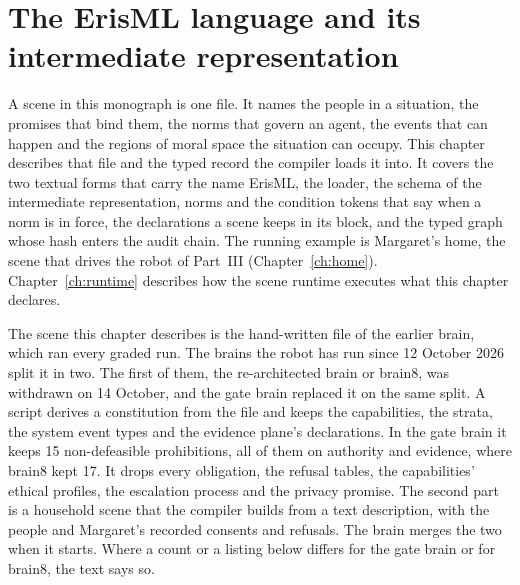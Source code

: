 \chapter{The ErisML language and its intermediate representation}\label{ch:erisml}

A scene in this monograph is one file. It names the people in a situation, the promises that bind
them, the norms that govern an agent, the events that can happen and the regions of moral space the
situation can occupy. This chapter describes that file and the typed record the compiler loads it
into. It covers the two textual forms that carry the name ErisML, the loader, the schema of the
intermediate representation, norms and the condition tokens that say when a norm is in force, the
declarations a scene keeps in its  block, and the typed graph whose hash enters the
audit chain. The running example is Margaret's home, the scene that drives the robot of
Part~III (Chapter~\ref{ch:home}). Chapter~\ref{ch:runtime} describes how the scene runtime executes
what this chapter declares.

The scene this chapter describes is the hand-written file of the earlier brain, which ran every
graded run. The brains the robot has run since 12 October 2026 split it in two. The first of them,
the re-architected brain or brain8, was withdrawn on 14 October, and the gate brain replaced it on
the same split. A script derives a constitution from the file and keeps the capabilities, the
strata, the system event types and the evidence plane's declarations. In the gate brain it keeps
15 non-defeasible prohibitions, all of them on authority and evidence, where brain8 kept 17. It
drops every obligation, the refusal tables, the capabilities' ethical profiles, the escalation
process and the privacy promise. The second part is a household scene that the compiler builds from
a text description, with the people and Margaret's recorded consents and refusals. The brain merges
the two when it starts. Where a count or a listing below differs for the gate brain or for brain8,
the text says so.

